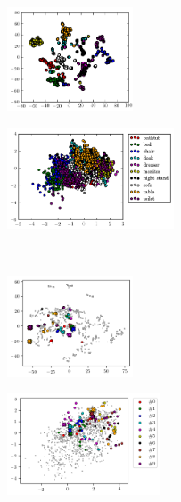 \begin{figure}[tp]
    \vspace*{-\figskipabove px}
    \centering
    \hspace*{-22px}
    \begin{subfigure}[t]{0.49\linewidth}
        \includegraphics[height=3.1cm]{gls_modelnet10_codes_}
        \label{fig:results-latent-space-a1}
    \end{subfigure}
    \hspace*{-12px}
    \begin{subfigure}[t]{0.49\linewidth}
        \includegraphics[height=3cm]{gls_modelnet10_codes2}
        \label{fig:results-latent-space-a2}
    \end{subfigure}
    \\
    \hspace*{-22px}
    \begin{subfigure}[t]{0.49\linewidth}
        \includegraphics[height=3cm]{gls_clean_codes_outputs_}
        \label{fig:results-latent-space-b1}
    \end{subfigure}
    \hspace*{-12px}
    \begin{subfigure}[t]{0.49\linewidth}
        \includegraphics[height=3cm]{gls_clean_codes2_outputs}

\end{subfigure}
\end{figure}
